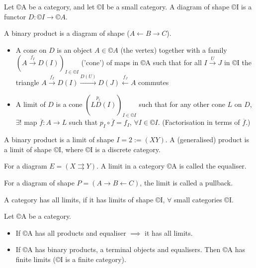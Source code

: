 \documentclass[12pt]{article}					%
\begin{document}
\begin{definice}
	Let ©A be a category, and let ©I be a small category. A diagram of shape ©I is a functor $D: ©I \rightarrow ©A$.

	\begin{prikladyin}
		A binary product is a diagram of shape ($A \leftarrow B \rightarrow C$).
	\end{prikladyin}

	\begin{itemize}
		\item A cone on $D$ is an object $A \in ©A$ (the vertex) together with a family $(A \overset{f_I}\rightarrow D(I))_{I \in ©I}$ ('cone') of maps in ©A such that for all $I \overset{U}\rightarrow J$ in ©I the triangle $A \overset{f_I}\rightarrow D(I) \overset{D(U)}\rightarrow D(J) \overset{f_J}\leftarrow A$ commutes
		\item A limit of $D$ is a cone $(L \overset{p_i} D(I))_{I \in ©I}$ such that for any other cone $L$ on $D$, $\exists!$ map $\overline{f}: A \rightarrow L$ such that $p_I ∘ \overline{f} = f_I$, $\forall I \in ©I$. (Factorisation in terms of $\overline{f}$.)
	\end{itemize}
\end{definice}

\begin{priklady}
	A binary product is a limit of shape $I = 2 := (X Y)$. A (generalised) product is a limit of shape ©I, where ©I is a discrete category.
\end{priklady}

\begin{priklady}[Equaliser]
	For a diagram $E = (X \rightrightarrows Y)$. A limit in a category ©A is called the equaliser.
\end{priklady}

\begin{priklady}[Pullback]
	For a diagram of shape $P = (A \rightarrow B \leftarrow C)$, the limit is called a pullback.
\end{priklady}

\begin{definice}
	A category has all limits, if it has limits of shape ©I, $\forall$ small categories ©I.
\end{definice}

\begin{tvrzeni}
	Let ©A be a category.
	\begin{itemize}
		\item If ©A has all products and equaliser $\implies$ it has all limits.
		\item If ©A has binary products, a terminal objects and equalisers. Then ©A has finite limits (©I is a finite category).
	\end{itemize}
\end{tvrzeni}
\end{document}
